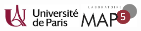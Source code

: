 \documentclass[12pt,a4paper]{article}
\begin{document}
\thispagestyle{empty}
\vspace{-2cm}

\voffset-10pt


\noindent
\hbox{\includegraphics[width=4cm]{logo_udp.jpeg}} 
\hfill
\hbox{\includegraphics[width=3cm]{logo_map5.png}}
\hfill
\hfill

\vspace{7mm}
\end{document}
